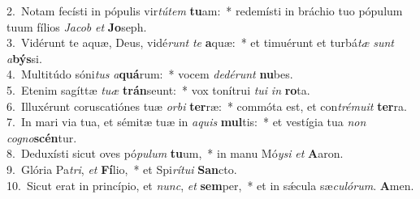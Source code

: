 {2.~}Notam fecísti in pópulis vir\textit{tú}\textit{tem} \textbf{tu}am:~* redemísti in bráchio tuo pópulum tuum fílios \textit{Ja}\textit{cob} \textit{et} \textbf{Jo}seph.\\
{3.~}Vidérunt te aquæ, Deus, vidé\textit{runt} \textit{te} \textbf{a}quæ:~* et timuérunt et turbá\textit{tæ} \textit{sunt} \textit{a}\textbf{býs}si.\\
{4.~}Multitúdo sóni\textit{tus} \textit{a}\textbf{quá}rum:~* vocem \textit{de}\textit{dé}\textit{runt} \textbf{nu}bes.\\
{5.~}Etenim sagíttæ \textit{tu}\textit{æ} \textbf{trán}seunt:~* vox tonítrui \textit{tu}\textit{i} \textit{in} \textbf{ro}ta.\\
{6.~}Illuxérunt coruscatiónes tuæ \textit{or}\textit{bi} \textbf{ter}ræ:~* commóta est, et con\textit{tré}\textit{mu}\textit{it} \textbf{ter}ra.\\
{7.~}In mari via tua, et sémitæ tuæ in \textit{a}\textit{quis} \textbf{mul}tis:~* et vestígia tua \textit{non} \textit{co}\textit{gno}\textbf{scén}tur.\\
{8.~}Deduxísti sicut oves pó\textit{pu}\textit{lum} \textbf{tu}um,~* in manu Mó\textit{y}\textit{si} \textit{et} \textbf{A}aron.\\
{9.~}Glória Pa\textit{tri}, \textit{et} \textbf{Fí}lio,~* et Spi\textit{rí}\textit{tu}\textit{i} \textbf{San}cto.\\
{10.~}Sicut erat in princípio, et \textit{nunc}, \textit{et} \textbf{sem}per,~* et in sǽcula sæ\textit{cu}\textit{ló}\textit{rum}. \textbf{A}men.\\

